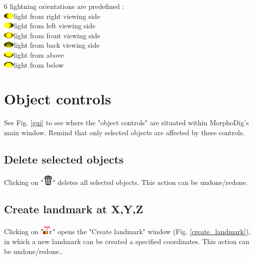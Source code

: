 6 lightning orientations are predefined :\\
\includegraphics[scale=0.7]{images/06/light/light_right.png}light from right viewing side\\
\includegraphics[scale=0.7]{images/06/light/light_left.png}light from left viewing side\\
\includegraphics[scale=0.7]{images/06/light/light_front.png}light from front viewing side\\
\includegraphics[scale=0.7]{images/06/light/light_back.png}light from back viewing side\\
\includegraphics[scale=0.7]{images/06/light/light_above.png}light from above\\
\includegraphics[scale=0.7]{images/06/light/light_below.png}light from below\\


  \section{Object controls}
See Fig. \ref{gui} to see where the "object controls" are situated within MorphoDig's main window. Remind that only selected objects are affected by these controls.

\subsection{Delete selected objects}
Clicking on "\includegraphics[scale=0.7]{images/06/objects/delete2.png}" deletes all selected objects. This action can be undone/redone.

\subsection{Create landmark at X,Y,Z}
Clicking on "\includegraphics[scale=0.7]{images/06/objects/landmark_xyz.png}" opens the "Create landmark" window  (Fig. \ref{create_landmark}), in which a new landmark can be created a specified coordinates. This action can be undone/redone..

